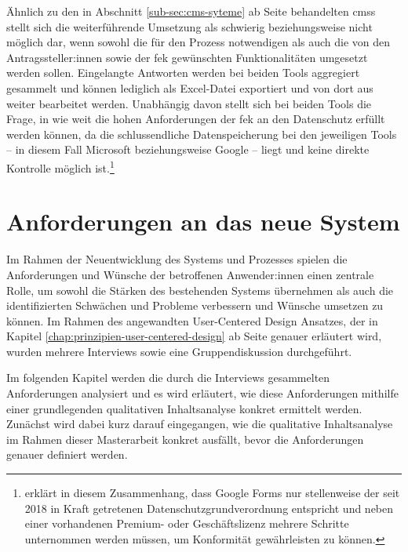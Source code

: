 \documentclass[a4paper,12pt,twoside]{scrreprt}
\begin{document}
Ähnlich zu den in Abschnitt \ref{sub-sec:cms-syteme} ab Seite \pageref{sub-sec:cms-syteme} behandelten \aclp{cms} stellt sich die weiterführende Umsetzung als schwierig beziehungsweise nicht möglich dar, wenn sowohl die für den Prozess notwendigen als auch die von den Antragssteller:innen sowie der \ac{fek} gewünschten Funktionalitäten umgesetzt werden sollen. Eingelangte Antworten werden bei beiden Tools aggregiert gesammelt und können lediglich als Excel-Datei exportiert und von dort aus weiter bearbeitet werden. \cite{microsoft_corporation_wie_2021, google_ireland_limited_ergebnisse_2023} Unabhängig davon stellt sich bei beiden Tools die Frage, in wie weit die hohen Anforderungen der \acl{fek} an den Datenschutz erfüllt werden können, da die schlussendliche Datenspeicherung bei den jeweiligen Tools -- in diesem Fall Microsoft beziehungsweise Google -- liegt und keine direkte Kontrolle möglich ist.\footnote{\cite{visitor_analytics_gmbh_ist_2022} erklärt in diesem Zusammenhang, dass Google Forms nur stellenweise der seit 2018 in Kraft getretenen Datenschutzgrundverordnung entspricht und neben einer vorhandenen Premium- oder Geschäftslizenz mehrere Schritte unternommen werden müssen, um Konformität gewährleisten zu können.}

\chapter{Anforderungen an das neue System}
\label{chap:anforderung-neues-system}

Im Rahmen der Neuentwicklung des Systems und Prozesses spielen die Anforderungen und Wünsche der betroffenen Anwender:innen einen zentrale Rolle, um sowohl die Stärken des bestehenden Systems übernehmen als auch die identifizierten Schwächen und Probleme verbessern und Wünsche umsetzen zu können. Im Rahmen des angewandten User-Centered Design Ansatzes, der in Kapitel \ref{chap:prinzipien-user-centered-design} ab Seite \pageref{chap:prinzipien-user-centered-design} genauer erläutert wird, wurden mehrere Interviews sowie eine Gruppendiskussion durchgeführt.

Im folgenden Kapitel werden die durch die Interviews gesammelten Anforderungen analysiert und es wird erläutert, wie diese Anforderungen mithilfe einer grundlegenden qualitativen Inhaltsanalyse konkret ermittelt werden. Zunächst wird dabei kurz darauf eingegangen, wie die qualitative Inhaltsanalyse im Rahmen dieser Masterarbeit konkret ausfällt, bevor die Anforderungen genauer definiert werden.
\end{document}
